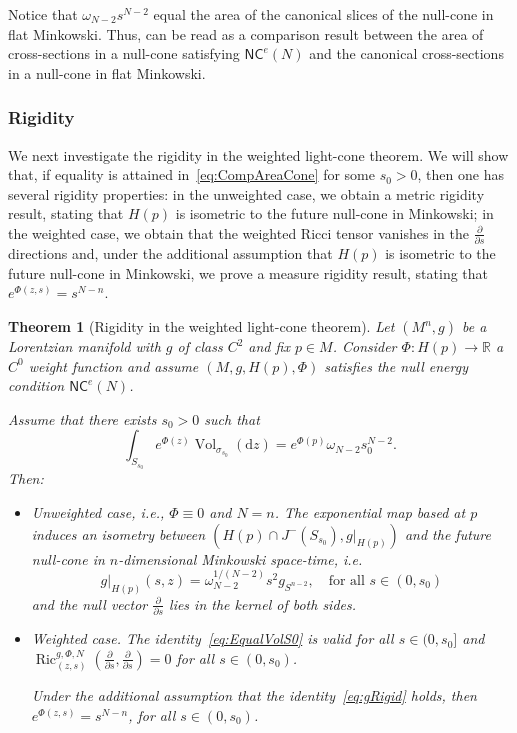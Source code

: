 \documentclass[12pt,a4paper]{amsart}
\theoremstyle{plain}
\newtheorem{theorem}[lemma]{Theorem}
\theoremstyle{definition}
\numberwithin{equation}{section}
\newcommand{\R}{\mathbb{R}}
\DeclareMathOperator{\Ric}{Ric}
\DeclareMathOperator{\vol}{Vol}
\newcommand{\de}{{\mathrm{d}}}
\newcommand{\NC}{\mathsf{NC}}
\begin{document}
Notice that $\omega_{N-2} s^{N-2}$
 equal the area of the canonical slices of the null-cone in flat Minkowski. Thus,   can be read as a comparison result between the area of cross-sections in a null-cone satisfying $\NC^e(N)$ and the canonical cross-sections in a null-cone in flat Minkowski.
 






\subsubsection{Rigidity}

We next investigate the rigidity in the weighted light-cone theorem. We will show that, if equality is attained in~\eqref{eq:CompAreaCone} for some $s_0>0$, then one has several rigidity properties: in the unweighted case, we obtain a metric rigidity result, stating that $H(p)$ is isometric to the future null-cone in Minkowski; in the weighted case, we obtain that the weighted Ricci tensor vanishes in the $\frac{\partial}{\partial s}$ directions and, under the additional assumption that $H(p)$ is isometric to the future null-cone in Minkowski, we prove a measure rigidity result, stating that $e^{\Phi(z,s)}=s^{N-n}$. 

\begin{theorem}[Rigidity in the weighted light-cone theorem]
\label{T:WLCT-rigid}
Let $(M^n,g)$ be a Lorentzian manifold with $g$ of class $C^2$ and fix $p \in M$. 
Consider $\Phi : H(p) \to \R$
a $C^0$ weight function and assume 
$(M,g,H(p),\Phi)$ satisfies the null energy condition $\NC^e(N)$. 

Assume that there exists $ s_0 > 0$ such that  
%
\begin{equation}\label{eq:EqualVolS0}
\int_{S_{s_0}}e^{\Phi(z)}
\vol_{\sigma_{s_0}}(\de z)
= 
e^{\Phi(p)}\omega_{N-2} s_0^{N-2}. 
\end{equation}
Then:
\begin{itemize}
\item \emph{Unweighted case, i.e., $\Phi\equiv 0$ and $N=n$}. The exponential map based at $p$ induces an isometry between $(H(p)\cap J^{-}(S_{s_0}), g|_{H(p)})$ and the future null-cone in $n$-dimensional Minkowski space-time, i.e. 
\begin{equation}\label{eq:gRigid}
g|_{H(p)}(s,z)= \omega_{N-2}^{1/(N-2)} s^2 g_{S^{n-2}}, \quad \text{for all } s\in (0,s_0)
\end{equation}
and the null vector $\frac{\partial} {\partial s}$ lies in the kernel of both sides.
\item \emph{Weighted case}. The identity~\eqref{eq:EqualVolS0} is valid for all $s\in (0,s_0]$ and $\Ric^{g,\Phi,N}_{(z,s)}(\frac{\partial} {\partial s}, \frac{\partial} {\partial s}) = 0$ for all $s\in (0,s_0)$. 

\noindent
Under the additional assumption that the identity~\eqref{eq:gRigid} holds, then $e^{\Phi(z,s)}=s^{N-n}$, for all $s\in (0,s_0)$.
\end{itemize}
\end{theorem}
\end{document}
